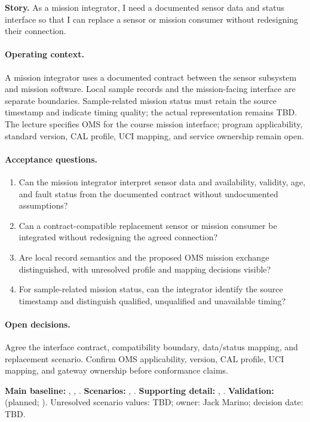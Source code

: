 \noindent\textbf{Story.} As a mission integrator, I need a documented sensor data and status interface so that I can replace a sensor or mission consumer without redesigning their connection.

\paragraph{Operating context.} A mission integrator uses a documented contract between the sensor subsystem and mission software. Local sample records and the mission-facing interface are separate boundaries. Sample-related mission status must retain the source timestamp and indicate timing quality; the actual representation remains TBD. The lecture specifies OMS for the course mission interface; program applicability, standard version, CAL profile, UCI mapping, and service ownership remain open.

\paragraph{Acceptance questions.}
\begin{enumerate}
\item Can the mission integrator interpret sensor data and availability, validity, age, and fault status from the documented contract without undocumented assumptions?
\item Can a contract-compatible replacement sensor or mission consumer be integrated without redesigning the agreed connection?
\item Are local record semantics and the proposed OMS mission exchange distinguished, with unresolved profile and mapping decisions visible?
\item For sample-related mission status, can the integrator identify the source timestamp and distinguish qualified, unqualified and unavailable timing?
\end{enumerate}
\paragraph{Open decisions.} Agree the interface contract, compatibility boundary, data/status mapping, and replacement scenario. Confirm OMS applicability, version, CAL profile, UCI mapping, and gateway ownership before conformance claims.

\begingroup\raggedright
\noindent\textbf{Main baseline:} , , .
\noindent\textbf{Scenarios:} , .
\noindent\textbf{Supporting detail:} , .
\noindent\textbf{Validation:}  (planned; \StatusPending). Unresolved scenario values: TBD; owner: Jack Marino; decision date: TBD.\par\endgroup

